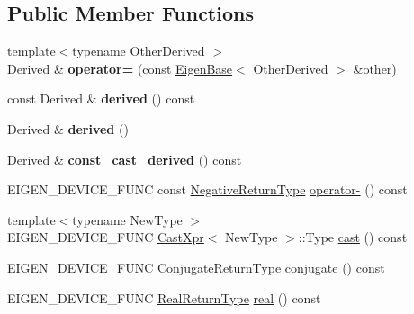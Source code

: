 \subsection*{Public Member Functions}
\begin{DoxyCompactItemize}
\item 
\mbox{\label{class_eigen_1_1_sparse_matrix_base_a379e2a65ec661cceaddc225120ad5cb1}} 
{\footnotesize template$<$typename Other\+Derived $>$ }\\Derived \& {\bfseries operator=} (const \mbox{\hyperlink{struct_eigen_1_1_eigen_base}{Eigen\+Base}}$<$ Other\+Derived $>$ \&other)
\item 
\mbox{\label{class_eigen_1_1_sparse_matrix_base_aa75a5f413b9c78b4ff906091cc9706a5}} 
const Derived \& {\bfseries derived} () const
\item 
\mbox{\label{class_eigen_1_1_sparse_matrix_base_ae4a2d472e2aaf7b58b44fa3ab8ce8530}} 
Derived \& {\bfseries derived} ()
\item 
\mbox{\label{class_eigen_1_1_sparse_matrix_base_a34a7f8da0b505b870a65bf58d946a502}} 
Derived \& {\bfseries const\+\_\+cast\+\_\+derived} () const
\item 
E\+I\+G\+E\+N\+\_\+\+D\+E\+V\+I\+C\+E\+\_\+\+F\+U\+NC const \mbox{\hyperlink{class_eigen_1_1_cwise_unary_op}{Negative\+Return\+Type}} \mbox{\hyperlink{class_eigen_1_1_sparse_matrix_base_ad0d7bb4733595293b54fc8b11c9f90bd}{operator-\/}} () const
\item 
{\footnotesize template$<$typename New\+Type $>$ }\\E\+I\+G\+E\+N\+\_\+\+D\+E\+V\+I\+C\+E\+\_\+\+F\+U\+NC \mbox{\hyperlink{struct_eigen_1_1_sparse_matrix_base_1_1_cast_xpr}{Cast\+Xpr}}$<$ New\+Type $>$\+::Type \mbox{\hyperlink{class_eigen_1_1_sparse_matrix_base_a0a096b9ebe064a3d55a124da2e3ee008}{cast}} () const
\item 
E\+I\+G\+E\+N\+\_\+\+D\+E\+V\+I\+C\+E\+\_\+\+F\+U\+NC \mbox{\hyperlink{struct_eigen_1_1internal_1_1true__type}{Conjugate\+Return\+Type}} \mbox{\hyperlink{class_eigen_1_1_sparse_matrix_base_a22b6b4e39a3d31125a3f8f53b1083224}{conjugate}} () const
\item 
E\+I\+G\+E\+N\+\_\+\+D\+E\+V\+I\+C\+E\+\_\+\+F\+U\+NC \mbox{\hyperlink{struct_eigen_1_1internal_1_1true__type}{Real\+Return\+Type}} \mbox{\hyperlink{class_eigen_1_1_sparse_matrix_base_a8a21aa3017e094f1c07be866d47d7539}{real}} () const

\end{DoxyCompactItemize}
